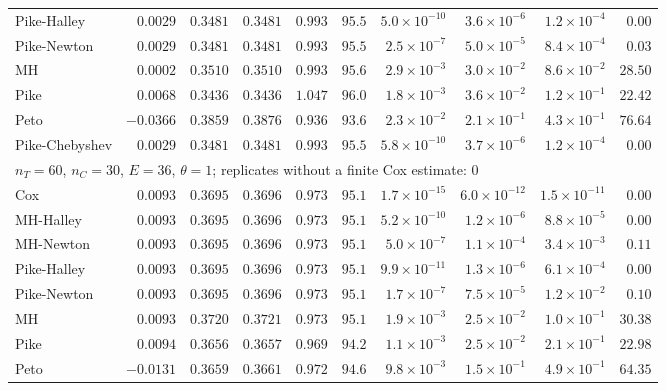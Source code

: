 \begin{landscape}
\begin{longtable}{lrrrrrrrrr}
Pike-Halley & $0.0029$ & $0.3481$ & $0.3481$ & $0.993$ & $95.5$ & $5.0 \times 10^{-10}$ & $3.6 \times 10^{-6}$ & $1.2 \times 10^{-4}$ & $0.00$ \\
Pike-Newton & $0.0029$ & $0.3481$ & $0.3481$ & $0.993$ & $95.5$ & $2.5 \times 10^{-7}$ & $5.0 \times 10^{-5}$ & $8.4 \times 10^{-4}$ & $0.03$ \\
MH & $0.0002$ & $0.3510$ & $0.3510$ & $0.993$ & $95.6$ & $2.9 \times 10^{-3}$ & $3.0 \times 10^{-2}$ & $8.6 \times 10^{-2}$ & $28.50$ \\
Pike & $0.0068$ & $0.3436$ & $0.3436$ & $1.047$ & $96.0$ & $1.8 \times 10^{-3}$ & $3.6 \times 10^{-2}$ & $1.2 \times 10^{-1}$ & $22.42$ \\
Peto & $-0.0366$ & $0.3859$ & $0.3876$ & $0.936$ & $93.6$ & $2.3 \times 10^{-2}$ & $2.1 \times 10^{-1}$ & $4.3 \times 10^{-1}$ & $76.64$ \\
Pike-Chebyshev & $0.0029$ & $0.3481$ & $0.3481$ & $0.993$ & $95.5$ & $5.8 \times 10^{-10}$ & $3.7 \times 10^{-6}$ & $1.2 \times 10^{-4}$ & $0.00$ \\
\multicolumn{10}{l}{$n_T = 60$, $n_C = 30$, $E = 36$, $\theta = 1$; replicates without a finite Cox estimate: 0} \\
Cox & $0.0093$ & $0.3695$ & $0.3696$ & $0.973$ & $95.1$ & $1.7 \times 10^{-15}$ & $6.0 \times 10^{-12}$ & $1.5 \times 10^{-11}$ & $0.00$ \\
MH-Halley & $0.0093$ & $0.3695$ & $0.3696$ & $0.973$ & $95.1$ & $5.2 \times 10^{-10}$ & $1.2 \times 10^{-6}$ & $8.8 \times 10^{-5}$ & $0.00$ \\
MH-Newton & $0.0093$ & $0.3695$ & $0.3696$ & $0.973$ & $95.1$ & $5.0 \times 10^{-7}$ & $1.1 \times 10^{-4}$ & $3.4 \times 10^{-3}$ & $0.11$ \\
Pike-Halley & $0.0093$ & $0.3695$ & $0.3696$ & $0.973$ & $95.1$ & $9.9 \times 10^{-11}$ & $1.3 \times 10^{-6}$ & $6.1 \times 10^{-4}$ & $0.00$ \\
Pike-Newton & $0.0093$ & $0.3695$ & $0.3696$ & $0.973$ & $95.1$ & $1.7 \times 10^{-7}$ & $7.5 \times 10^{-5}$ & $1.2 \times 10^{-2}$ & $0.10$ \\
MH & $0.0093$ & $0.3720$ & $0.3721$ & $0.973$ & $95.1$ & $1.9 \times 10^{-3}$ & $2.5 \times 10^{-2}$ & $1.0 \times 10^{-1}$ & $30.38$ \\
Pike & $0.0094$ & $0.3656$ & $0.3657$ & $0.969$ & $94.2$ & $1.1 \times 10^{-3}$ & $2.5 \times 10^{-2}$ & $2.1 \times 10^{-1}$ & $22.98$ \\
Peto & $-0.0131$ & $0.3659$ & $0.3661$ & $0.972$ & $94.6$ & $9.8 \times 10^{-3}$ & $1.5 \times 10^{-1}$ & $4.9 \times 10^{-1}$ & $64.35$ \\

\end{longtable}
\end{landscape}
